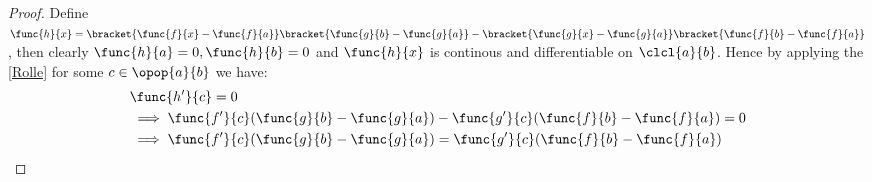 \begin{proof}
    Define \(\func{h}{x} = \bracket{\func{f}{x} - \func{f}{a}}\bracket{\func{g}{b} - \func{g}{a}} -  \bracket{\func{g}{x} - \func{g}{a}}\bracket{\func{f}{b} - \func{f}{a}}\), then clearly \(\func{h}{a} =0, \func{h}{b} =0\) and \(\func{h}{x}\) is continous and differentiable on \(\clcl{a}{b}\). Hence by applying the \cref{Rolle} for some \(c \in \opop{a}{b}\) we have:
    \begin{align*}
         & \func{h'}{c} = 0                                                                                \\
         & \implies \func{f'}{c}(\func{g}{b} - \func{g}{a}) -  \func{g'}{c}(\func{f}{b} - \func{f}{a}) = 0 \\
         & \implies  \func{f'}{c}(\func{g}{b} - \func{g}{a}) = \func{g'}{c}(\func{f}{b} - \func{f}{a})
    \end{align*}
\end{proof}

